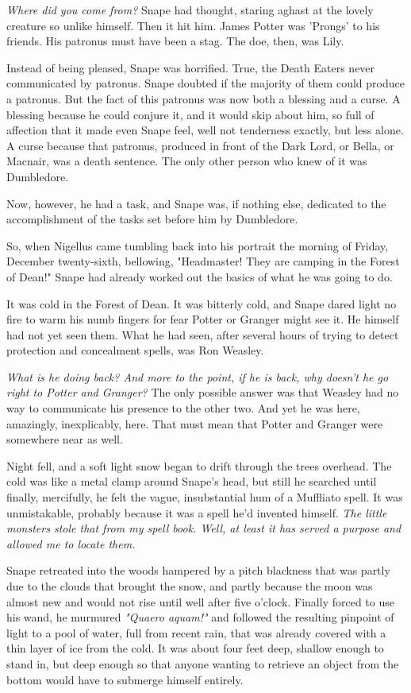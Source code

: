 \documentclass[a4paper,11pt]{article}
\begin{document}
\emph{Where did you come from?} Snape had thought, staring aghast at the lovely creature so unlike himself. Then it hit him. James Potter was 'Prongs' to his friends. His patronus must have been a stag. The doe, then, was Lily.

Instead of being pleased, Snape was horrified. True, the Death Eaters never communicated by patronus. Snape doubted if the majority of them could produce a patronus. But the fact of this patronus was now both a blessing and a curse. A blessing because he could conjure it, and it would skip about him, so full of affection that it made even Snape feel, well not tenderness exactly, but less alone. A curse because that patronus, produced in front of the Dark Lord, or Bella, or Macnair, was a death sentence. The only other person who knew of it was Dumbledore.

Now, however, he had a task, and Snape was, if nothing else, dedicated to the accomplishment of the tasks set before him by Dumbledore.

So, when Nigellus came tumbling back into his portrait the morning of Friday, December twenty-sixth, bellowing, "Headmaster! They are camping in the Forest of Dean!" Snape had already worked out the basics of what he was going to do.

It was cold in the Forest of Dean. It was bitterly cold, and Snape dared light no fire to warm his numb fingers for fear Potter or Granger might see it. He himself had not yet seen them. What he had seen, after several hours of trying to detect protection and concealment spells, was Ron Weasley.

\emph{What is he doing back? And more to the point, if he is back, why doesn't he go right to Potter and Granger?} The only possible answer was that Weasley had no way to communicate his presence to the other two. And yet he was here, amazingly, inexplicably, here. That must mean that Potter and Granger were somewhere near as well.

Night fell, and a soft light snow began to drift through the trees overhead. The cold was like a metal clamp around Snape's head, but still he searched until finally, mercifully, he felt the vague, insubstantial hum of a Muffliato spell. It was unmistakable, probably because it was a spell he'd invented himself. \emph{The little monsters stole that from my spell book. Well, at least it has served a purpose and allowed me to locate them.}

Snape retreated into the woods hampered by a pitch blackness that was partly due to the clouds that brought the snow, and partly because the moon was almost new and would not rise until well after five o'clock. Finally forced to use his wand, he murmured \emph{"Quaero aquam!"} and followed the resulting pinpoint of light to a pool of water, full from recent rain, that was already covered with a thin layer of ice from the cold. It was about four feet deep, shallow enough to stand in, but deep enough so that anyone wanting to retrieve an object from the bottom would have to submerge himself entirely.
\end{document}
